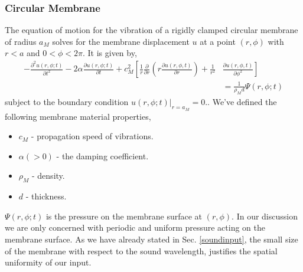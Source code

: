 \subsubsection{Circular Membrane}
The equation of motion for the vibration of a rigidly clamped circular membrane of radius $a_M$ solves for the membrane displacement $u$ at
a point $(r,\phi)$ with $r<a$ and $0<\phi<2\pi$. It is given by,
\begin{equation}\label{membraneequation1}
 \begin{split}
 -\frac{\partial^2 u(r,\phi;t)}{\partial t^2}-2\alpha\frac{\partial u(r,\phi;t)}{\partial t}+c^2_M \left[\frac{1}{r}\frac{\partial}{\partial r}\left(r\frac{\partial u(r,\phi,t)}{\partial r}\right)\right. +\frac{1}{r^2}&\left.\frac{\partial u(r,\phi,t)}{\partial \phi^2}\right]
 \\ &=\frac{1}{\rho_M d}\Psi(r,\phi;t)
 \end{split}
\end{equation}
subject to the boundary condition $u(r,\phi;t)|_{r=a_M}=0$.. We've defined the following membrane material properties,
\begin{itemize}
 \item $c_M$ - propagation speed of vibrations.
 \item $\alpha (>0)$ - the damping coefficient.
 \item $\rho_M$ - density.
 \item $d$ - thickness.
\end{itemize}
$\Psi(r,\phi;t)$ is the pressure on the membrane surface at $(r,\phi)$. In our discussion we are only concerned with periodic and uniform 
pressure acting on the membrane surface. As we have already stated in Sec. \ref{soundinput},  the small size of the membrane with respect to the sound wavelength,
justifies the spatial uniformity of our input.
